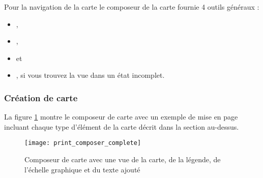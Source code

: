 Pour la navigation de la carte le composeur de la carte fournie 4 outils
g\'en\'eraux :

\begin{itemize}
\item {},
\item {},
\item {} et
\item {}, si vous trouvez la vue dans
un \'etat incomplet.
\end{itemize}

\subsubsection{Cr\'eation de carte}

La figure \ref{fig:print_composer_complete} montre le composeur de carte avec
un exemple de mise en page incluant chaque type d'\'el\'ement de la carte d\'ecrit
dans la section au-dessus.

\begin{figure}[h]
   \begin{center}
\caption{Composeur de carte avec une vue de la carte, de la l\'egende, de
l'\'echelle graphique et du texte ajout\'e
\nixcaption}
   \label{fig:print_composer_complete}\smallskip
   \texttt{[image: print\_composer\_complete]}
\end{center}
\end{figure}

